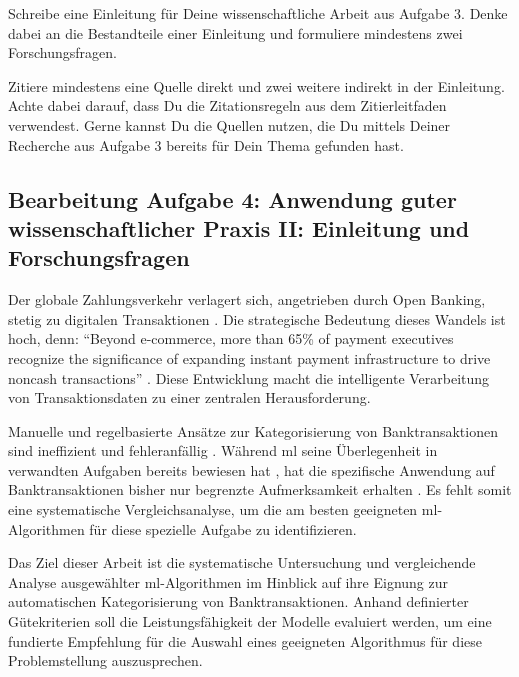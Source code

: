 
\begin{enumerate}[leftmargin=*]
	\itshape{
	\item Schreibe eine Einleitung für Deine wissenschaftliche Arbeit aus Aufgabe 3. Denke dabei an die
	      Bestandteile einer Einleitung und formuliere mindestens zwei Forschungsfragen.
	\item Zitiere mindestens eine Quelle direkt und zwei weitere indirekt in der Einleitung. Achte dabei darauf, dass
	      Du die Zitationsregeln aus dem Zitierleitfaden verwendest. Gerne kannst Du die Quellen nutzen, die Du
	      mittels Deiner Recherche aus Aufgabe 3 bereits für Dein Thema gefunden hast.
	      }
\end{enumerate}

\clearpage

\subsection*{Bearbeitung Aufgabe 4: Anwendung guter wissenschaftlicher Praxis II: Einleitung und Forschungsfragen}
Der globale Zahlungsverkehr verlagert sich, angetrieben durch Open Banking, stetig zu digitalen Transaktionen \parencites{bis2025}[S. 12]{capgemini2024}. Die strategische Bedeutung dieses Wandels ist hoch, denn: \enquote{Beyond e-commerce, more than 65\% of payment executives recognize the significance of expanding instant payment infrastructure to drive noncash transactions} \parencite[S. 10]{capgemini2024}. Diese Entwicklung macht die intelligente Verarbeitung von Transaktionsdaten zu einer zentralen Herausforderung.

Manuelle und regelbasierte Ansätze zur Kategorisierung von Banktransaktionen sind ineffizient und fehleranfällig \parencite[S. 35-37]{capgemini2024}. Während \gls{ml} seine Überlegenheit in verwandten Aufgaben bereits bewiesen hat \parencite[S. 10]{cronin2017}, hat die spezifische Anwendung auf Banktransaktionen bisher nur begrenzte Aufmerksamkeit erhalten \parencite[S. 1-2]{ta2023}. Es fehlt somit eine systematische Vergleichsanalyse, um die am besten geeigneten \gls{ml}-Algorithmen für diese spezielle Aufgabe zu identifizieren.

Das Ziel dieser Arbeit ist die systematische Untersuchung und vergleichende Analyse ausgewählter \gls{ml}-Algorithmen im Hinblick auf ihre Eignung zur automatischen Kategorisierung von Banktransaktionen. Anhand definierter Gütekriterien soll die Leistungsfähigkeit der Modelle evaluiert werden, um eine fundierte Empfehlung für die Auswahl eines geeigneten Algorithmus für diese Problemstellung auszusprechen.

